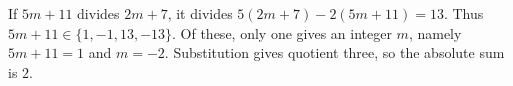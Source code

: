 If $5m+11$ divides $2m+7$, it divides $5(2m+7)-2(5m+11)=13$. Thus $5m+11\in\{1,-1,13,-13\}$. Of these, only one gives an integer $m$, namely $5m+11=1$ and $m=-2$. Substitution gives quotient three, so the absolute sum is $\boxed2$.
